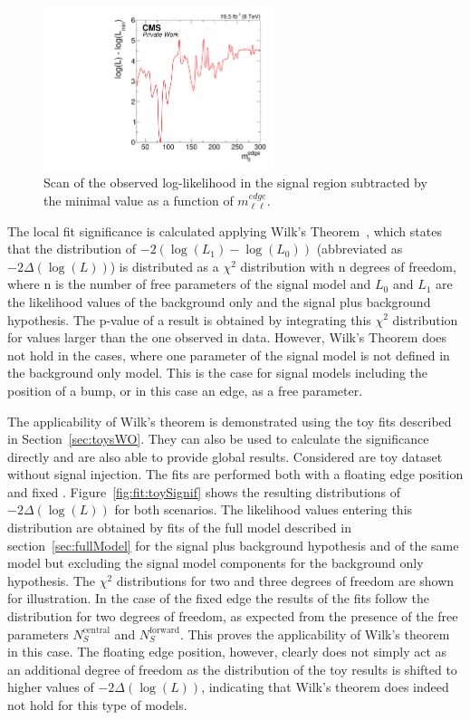 \begin{figure}[htbp]
\centering
  \includegraphics[width=0.6\textwidth]{plots/results/fit/signal.pdf}
\caption{Scan of the observed log-likelihood in the signal region subtracted by the minimal value as a function of $m_{\ell\ell}^{edge}$.}
\label{fig:fit:likelihoodScan}
\end{figure}

The local fit significance is calculated applying Wilk's Theorem~\cite{wilks1938}, which states that the distribution of $-2\left(\log\left(L_1\right)-\log\left(L_0\right)\right)$ (abbreviated as $-2\Delta\left(\log\left(L\right)\right)$) is distributed as a $\chi^2$ distribution with n degrees of freedom, where n is the number of free parameters of the signal model and $L_0$ and $L_1$ are the likelihood values of the background only and the signal plus background hypothesis. The p-value of a result is obtained by integrating this $\chi^2$ distribution for values larger than the one observed in data. However, Wilk's Theorem does not hold in the cases, where one parameter of the signal model is not defined in the background only model. This is the case for signal models including the position of a bump, or in this case an edge, as a free parameter. 

The applicability of Wilk's theorem is demonstrated using the toy fits described in Section~\ref{sec:toysWO}. They can also be used to calculate the significance directly and are also able to provide global results.
Considered are toy dataset without signal injection. The fits are performed both with a floating edge position and fixed \mlledge. Figure~\ref{fig:fit:toySignif} shows the resulting distributions of $-2\Delta\left(\log\left(L\right)\right)$ for both scenarios. The likelihood values entering this distribution are obtained by fits of the full model described in section~\ref{sec:fullModel} for the signal plus background hypothesis and of the same model but excluding the signal model components for the background only hypothesis. The $\chi^2$ distributions for two and three degrees of freedom are shown for illustration. In the case of the fixed edge the results of the fits follow the distribution for two degrees of freedom, as expected from the presence of the free parameters $N_{S}^{\text{central}}$ and $N_{S}^{\text{forward}}$. This proves the applicability of Wilk's theorem in this case. The floating edge position, however, clearly does not simply act as an additional degree of freedom as the distribution of the toy results is shifted to higher values of $-2\Delta\left(\log\left(L\right)\right)$, indicating that Wilk's theorem does indeed not hold for this type of models.

